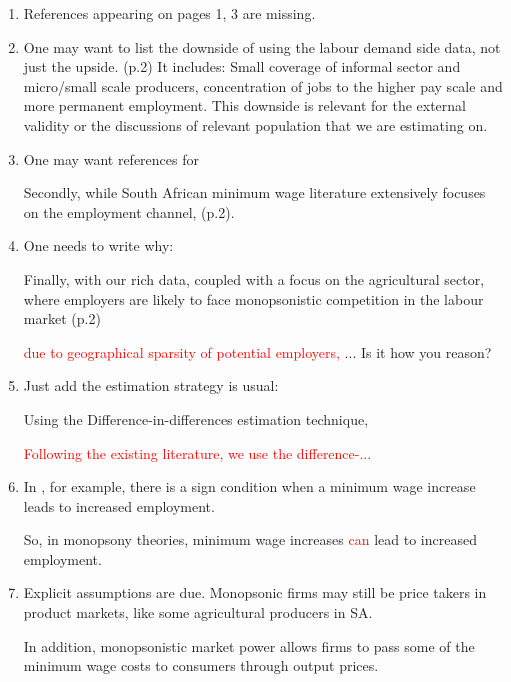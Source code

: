 \begin{enumerate}
\vspace{1.0ex}\setlength{\itemsep}{1.0ex}\setlength{\baselineskip}{12pt}
\item	References appearing on pages 1, 3 are missing.
\item	One may want to list the downside of using the labour demand side data, not just the upside. (p.2) It includes: Small coverage of informal sector and micro/small scale producers, concentration of jobs to the higher pay scale and more permanent employment. This downside is relevant for the external validity or the discussions of relevant population that we are estimating on.
\item	One may want references for 
\begin{lightgrayleftbar}
Secondly, while South African minimum wage literature extensively focuses on the employment channel, (p.2).
\end{lightgrayleftbar}
\item	One needs to write why:
\begin{lightgrayleftbar}
Finally, with our rich data, coupled with a focus on the agricultural sector, where employers are likely to face monopsonistic competition in the labour market (p.2)
\end{lightgrayleftbar}
\textcolor{red}{due to geographical sparsity of potential employers,} ... Is it how you reason?
\item	Just add the estimation strategy is usual:
\begin{lightgrayleftbar}
Using the Difference-in-differences estimation technique,
\end{lightgrayleftbar}
\textcolor{red}{Following the existing literature, we use the difference-...} 
\item	In \citet{Manning2006}, for example, there is a sign condition when a minimum wage increase leads to increased employment.
\begin{lightgrayleftbar}
So, in monopsony theories, minimum wage increases \textcolor{red}{can} lead to increased employment.
\end{lightgrayleftbar}
\item	 Explicit assumptions are due. Monopsonic firms may still be price takers in product markets, like some agricultural producers in SA.
\begin{lightgrayleftbar}
In addition, monopsonistic market power allows firms to pass some of the minimum wage costs to consumers through output prices.
\end{lightgrayleftbar}

\end{enumerate}
